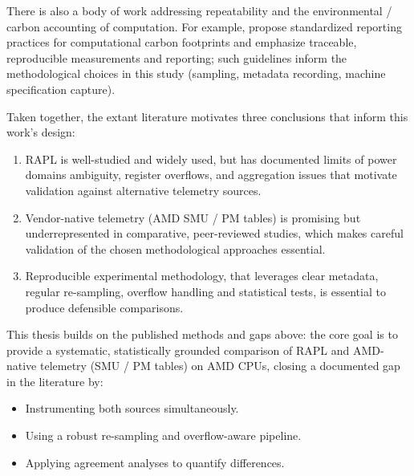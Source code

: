 There is also a body of work addressing repeatability and the
environmental / carbon accounting of computation. For example,
\textcite{GreenAlgos} propose standardized reporting practices
for computational carbon footprints and emphasize traceable,
reproducible measurements and reporting; such guidelines inform the
methodological choices in this study (sampling, metadata recording,
machine specification capture).

Taken together, the extant literature motivates three conclusions that
inform this work's design:

\begin{enumerate}
  \item \gls{RAPL} is well-studied and widely used, but has documented limits
    of power domains ambiguity, register overflows, and aggregation issues
    that motivate validation against alternative telemetry sources.
  \item Vendor-native telemetry (AMD \gls{SMU} / \gls{PM} tables) is promising
    but underrepresented in comparative, peer-reviewed studies, which makes
    careful validation of the chosen methodological approaches essential.
  \item Reproducible experimental methodology, that leverages clear metadata,
    regular re-sampling, overflow handling and statistical tests, is essential
    to produce defensible comparisons.
\end{enumerate}

This thesis builds on the published methods and gaps above: the core goal is
to provide a systematic, statistically grounded comparison of \gls{RAPL} and
AMD-native telemetry (\gls{SMU} / \gls{PM} tables) on AMD \gls{CPU}s, closing 
a documented gap in the literature by:

\begin{itemize}
  \item Instrumenting both sources simultaneously.
  \item Using a robust re-sampling and overflow-aware pipeline.
  \item Applying agreement analyses to quantify differences.
\end{itemize}
